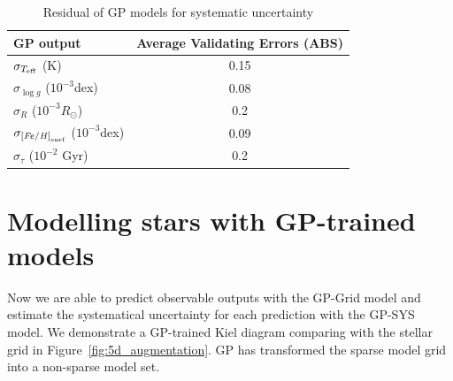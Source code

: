 \begin{table}
	\centering
	\caption{Residual of GP models for systematic uncertainty}
	\label{tab:sys}
	\begin{tabular}{lc}
		\hline
		GP output& Average Validating Errors (ABS) \\
		\hline
		$\sigma_{T_{\rm eff}}$  (K) & 0.15 \\
		$\sigma_{\log g}$  ($10^{-3}$dex)   & 0.08 \\
		$\sigma_{R}$ ($10^{-3}R_{\odot}$)   & 0.2 \\
		$\sigma_{\rm {\it [Fe/H]}_{\rm surf}}$ ($10^{-3}$dex) & 0.09 \\
		$\sigma_{\tau}$ ($10^{-2}$ Gyr)  & 0.2\\
		  \hline
	\end{tabular}
\end{table}


\section{Modelling stars with GP-trained models}\label{sec:augmentation}

Now we are able to predict observable outputs with the GP-Grid model and estimate the systematical uncertainty for each prediction with the GP-SYS model. We demonstrate a GP-trained Kiel diagram comparing with the stellar grid in Figure~\ref{fig:5d_augmentation}. GP has transformed the sparse model grid into a non-sparse model set. 

